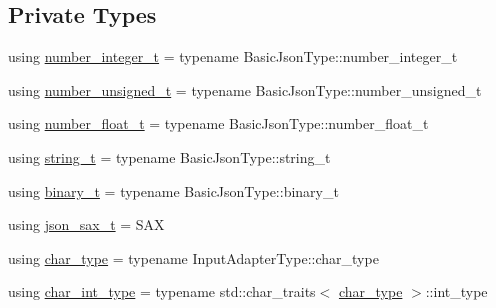 \subsection*{Private Types}
\begin{DoxyCompactItemize}
\item 
using \hyperlink{classnlohmann_1_1detail_1_1binary__reader_a2b46c2a929071fdb0b028befa77814bd}{number\+\_\+integer\+\_\+t} = typename Basic\+Json\+Type\+::number\+\_\+integer\+\_\+t
\item 
using \hyperlink{classnlohmann_1_1detail_1_1binary__reader_a02a70f424099428d9a69606b7fb7074a}{number\+\_\+unsigned\+\_\+t} = typename Basic\+Json\+Type\+::number\+\_\+unsigned\+\_\+t
\item 
using \hyperlink{classnlohmann_1_1detail_1_1binary__reader_ae4f1a7d10118d578ad03f7ee36df6fbe}{number\+\_\+float\+\_\+t} = typename Basic\+Json\+Type\+::number\+\_\+float\+\_\+t
\item 
using \hyperlink{classnlohmann_1_1detail_1_1binary__reader_a823c244e5dbf1a8edae40819f9434237}{string\+\_\+t} = typename Basic\+Json\+Type\+::string\+\_\+t
\item 
using \hyperlink{classnlohmann_1_1detail_1_1binary__reader_acf127bb88e4147fb692edabc2a0f0663}{binary\+\_\+t} = typename Basic\+Json\+Type\+::binary\+\_\+t
\item 
using \hyperlink{classnlohmann_1_1detail_1_1binary__reader_a4c33ab78a0df5afd524f16887550436d}{json\+\_\+sax\+\_\+t} = S\+AX
\item 
using \hyperlink{classnlohmann_1_1detail_1_1binary__reader_abc20ff256868de6791b3646ab33fff76}{char\+\_\+type} = typename Input\+Adapter\+Type\+::char\+\_\+type
\item 
using \hyperlink{classnlohmann_1_1detail_1_1binary__reader_aa12ade9a8c0acaebef6399e3d446b970}{char\+\_\+int\+\_\+type} = typename std\+::char\+\_\+traits$<$ \hyperlink{classnlohmann_1_1detail_1_1binary__reader_abc20ff256868de6791b3646ab33fff76}{char\+\_\+type} $>$\+::int\+\_\+type
\end{DoxyCompactItemize}
